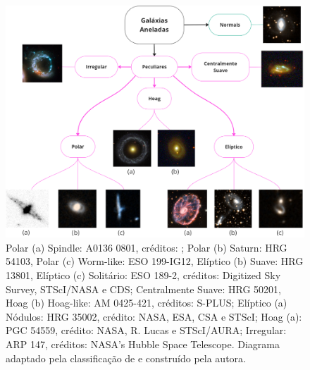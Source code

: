 \begin{figure}[t]
  \centering 
  \includegraphics[width=1.0\textwidth]{Imagens/quadro.png} 
  \caption[Família dos anéis]{Polar (a) Spindle: A0136 0801, créditos: \cite{1995AIPC}; Polar (b) Saturn: HRG 54103, Polar (c) Worm-like: ESO 199-IG12, Elíptico (b) Suave: HRG 13801, Elíptico (c) Solitário: ESO 189-2, créditos: Digitized Sky Survey, STScI/NASA e CDS; Centralmente Suave: HRG 50201, Hoag (b) Hoag-like: AM 0425-421, créditos: S-PLUS; Elíptico (a) Nódulos: HRG 35002, crédito: NASA, ESA, CSA e STScI; Hoag (a): PGC 54559, crédito: NASA, R. Lucas e STScI/AURA; Irregular: ARP 147, créditos: NASA's Hubble Space Telescope. Diagrama adaptado pela classificação de  e construído pela autora.}
  \label{fig:quadro} 
\end{figure}

